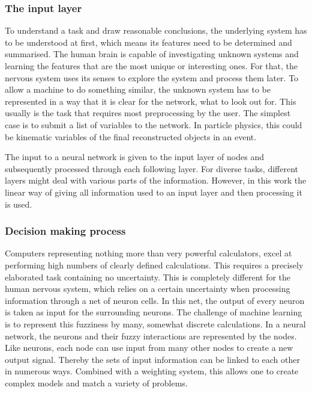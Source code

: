 \subsubsection{The input layer}

To understand a task and draw reasonable conclusions, the underlying system has to be understood at first, which means its features need to be determined and summarised. The human brain is capable of investigating unknown systems and learning the features that are the most unique or interesting ones. For that, the nervous system uses its senses to explore the system and process them later. To allow a machine to do something similar, the unknown system has to be represented in a way that it is clear for the network, what to look out for. This usually is the task that requires most preprocessing by the user. The simplest case is to submit a list of variables to the network. In particle physics, this could be kinematic variables of the final reconstructed objects in an event.

The input to a neural network is given to the input layer of nodes and subsequently processed through each following layer. For diverse tasks, different layers might deal with various parts of the information. However, in this work the linear way of giving all information used to an input layer and then processing it is used.

\subsubsection{Decision making process}

Computers representing nothing more than very powerful calculators, excel at performing high numbers of clearly defined calculations. This requires a precisely elaborated task containing no uncertainty.
This is completely different for the human nervous system, which relies on a certain uncertainty when processing information through a net of neuron cells. In this net, the output of every neuron is taken as input for the surrounding neurons. The challenge of machine learning is to represent this fuzziness by many, somewhat discrete calculations. In a neural network, the neurons and their fuzzy interactions are represented by the nodes. Like neurons, each node can use input from many other nodes to create a new output signal. Thereby the sets of input information can be linked to each other in numerous ways. Combined with a weighting system, this allows one to create complex models and match a variety of problems.

